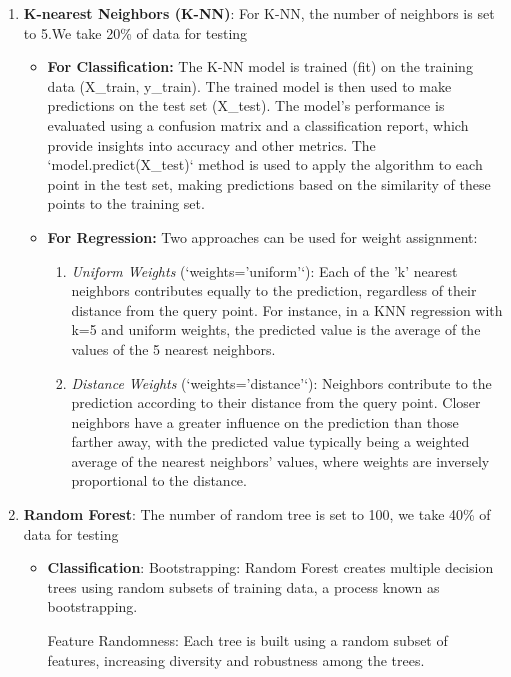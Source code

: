 \documentclass[a4paper]{article}
\begin{document}
\begin{enumerate}
	\item \textbf{K-nearest Neighbors (K-NN)}: 
	For K-NN, the number of neighbors is set to 5.We take 20\% of data for testing
	\begin{itemize}
		\item \textbf{For Classification:}
		The K-NN model is trained (fit) on the training data (X\_train, y\_train). The trained model is then used to make predictions on the test set (X\_test). The model's performance is evaluated using a confusion matrix and a classification report, which provide insights into accuracy and other metrics. The `model.predict(X\_test)` method is used to apply the algorithm to each point in the test set, making predictions based on the similarity of these points to the training set.
		
		\item \textbf{For Regression:}
		Two approaches can be used for weight assignment:
		\begin{enumerate}
			\item \textit{Uniform Weights} (`weights='uniform'`): Each of the 'k' nearest neighbors contributes equally to the prediction, regardless of their distance from the query point. For instance, in a KNN regression with k=5 and uniform weights, the predicted value is the average of the values of the 5 nearest neighbors.
			
			\item \textit{Distance Weights} (`weights='distance'`): Neighbors contribute to the prediction according to their distance from the query point. Closer neighbors have a greater influence on the prediction than those farther away, with the predicted value typically being a weighted average of the nearest neighbors' values, where weights are inversely proportional to the distance.
		\end{enumerate}
	\end{itemize}
	
	\item \textbf{Random Forest}: 
	The number of random tree is set to 100, we take 40\% of data for testing
	\begin{itemize}
\item \textbf{Classification}:
		Bootstrapping: Random Forest creates multiple decision trees using random subsets of training data, a process known as bootstrapping.
		
		Feature Randomness: Each tree is built using a random subset of features, increasing diversity and robustness among the trees.
		

\end{itemize}
\end{enumerate}
\end{document}
